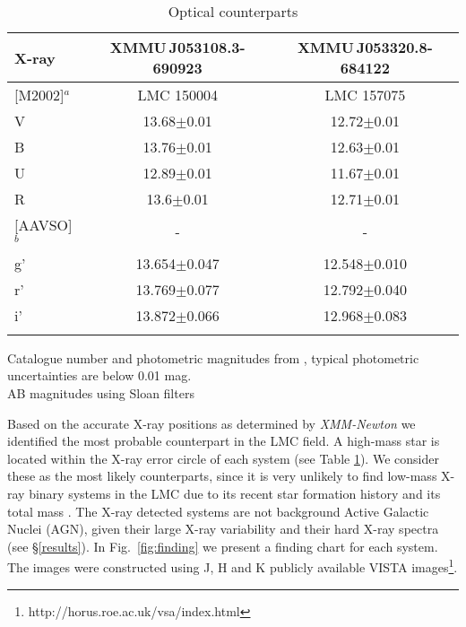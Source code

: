 \documentclass[a4paper,fleqn,usenatbib]{mnras}
\newcommand{\xmm}{{\it XMM-Newton}\xspace}
\newcommand{\canda}{XMMU\,J053108.3-690923\xspace} %
\newcommand{\candb}{XMMU\,J053320.8-684122\xspace} %
\begin{document}
\begin{table}
 \centering 
 \caption {Optical counterparts}
 	\label{tab:opt}
\begin{threeparttable}
\begin{tabular}{lcc}
\hline\noalign{\smallskip}
X-ray  &  \canda & \candb  \\
\hline\noalign{\smallskip}
[M2002]$^a$  & LMC 150004 & LMC 157075  \\
\noalign{\smallskip}
V & 13.68$\pm$0.01 & 12.72$\pm$0.01 \\
\noalign{\smallskip}
B & 13.76$\pm$0.01& 12.63$\pm$0.01 \\
\noalign{\smallskip}
U & 12.89$\pm$0.01 & 11.67$\pm$0.01 \\
\noalign{\smallskip}
R & 13.6$\pm$0.01& 12.71$\pm$0.01\\
\hline\noalign{\smallskip}
[AAVSO]$^b$  & - & - \\
\hline\noalign{\smallskip}
g' &13.654$\pm$0.047 & 12.548$\pm$0.010\\
\noalign{\smallskip}
r' & 13.769$\pm$0.077& 12.792$\pm$0.040 \\
\noalign{\smallskip}
i' & 13.872$\pm$0.066& 12.968$\pm$0.083  \\
\hline\noalign{\smallskip}
\end{tabular}
 Catalogue number and photometric magnitudes from \citet{2002ApJS..141...81M}, typical photometric uncertainties are below 0.01 mag. \\
 AB magnitudes using Sloan filters \citep{2015AAS...22533616H}\\
\end{threeparttable}
\end{table}
Based on the accurate X-ray positions as determined by \xmm we identified the most probable counterpart in the LMC field.
A high-mass star is located within the X-ray error circle of each system (see Table \ref{tab:opt}). 
We consider these as the most likely counterparts, since it is very unlikely to find low-mass X-ray binary systems in the LMC \citep{2004MNRAS.349..146G} due to its recent star formation history and its total mass \citep{2009AJ....138.1243H,2016MNRAS.459..528A}.
The X-ray detected systems are not background Active Galactic Nuclei (AGN), given their large X-ray variability \citep[AGN have typical normalized excess variance $<$1,][]{2014ApJ...781..105L} and their hard X-ray spectra  (see \S \ref{results}). 
In Fig.~\ref{fig:finding} we present a finding chart for each system. 
The images were constructed using J, H and K publicly available VISTA images\footnote{http://horus.roe.ac.uk/vsa/index.html}.
\end{document}
